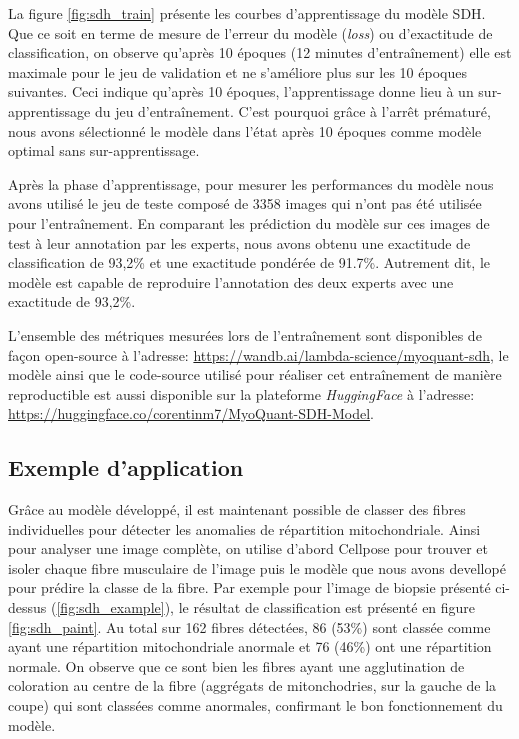 La figure \ref{fig:sdh_train} présente les courbes d'apprentissage du modèle SDH. Que ce soit en terme de mesure de l'erreur du modèle (\textit{loss}) ou d'exactitude de classification, on observe qu'après 10 époques (12 minutes d'entraînement) elle est maximale pour le jeu de validation et ne s'améliore plus sur les 10 époques suivantes. Ceci indique qu'après 10 époques, l'apprentissage donne lieu à un sur-apprentissage du jeu d'entraînement. C'est pourquoi grâce à l'arrêt prématuré, nous avons sélectionné le modèle dans l'état après 10 époques comme modèle optimal sans sur-apprentissage.

Après la phase d'apprentissage, pour mesurer les performances du modèle nous avons utilisé le jeu de teste composé de 3358 images qui n'ont pas été utilisée pour l'entraînement. En comparant les prédiction du modèle sur ces images de test à leur annotation par les experts, nous avons obtenu une exactitude de classification de 93,2\% et une exactitude pondérée de 91.7\%. Autrement dit, le modèle est capable de reproduire l'annotation des deux experts avec une exactitude de 93,2\%.

L'ensemble des métriques mesurées lors de l'entraînement sont disponibles de façon open-source à l'adresse: \href{https://wandb.ai/lambda-science/myoquant-sdh}{https://wandb.ai/lambda-science/myoquant-sdh}, le modèle ainsi que le code-source utilisé pour réaliser cet entraînement de manière reproductible est aussi disponible sur la plateforme \textit{HuggingFace} à l'adresse: \href{https://huggingface.co/corentinm7/MyoQuant-SDH-Model}{https://huggingface.co/corentinm7/MyoQuant-SDH-Model}.

\subsection{Exemple d'application}
Grâce au modèle développé, il est maintenant possible de classer des fibres individuelles pour détecter les anomalies de répartition mitochondriale. Ainsi pour analyser une image complète, on utilise d'abord Cellpose pour trouver et isoler chaque fibre musculaire de l'image puis le modèle que nous avons devellopé pour prédire la classe de la fibre. Par exemple pour l'image de biopsie présenté ci-dessus (\ref{fig:sdh_example}), le résultat de classification est présenté en figure \ref{fig:sdh_paint}. Au total sur 162 fibres détectées, 86 (53\%) sont classée comme ayant une répartition mitochondriale anormale et 76 (46\%) ont une répartition normale. On observe que ce sont bien les fibres ayant une agglutination de coloration au centre de la fibre (aggrégats de mitonchodries, sur la gauche de la coupe) qui sont classées comme anormales, confirmant le bon fonctionnement du modèle.

